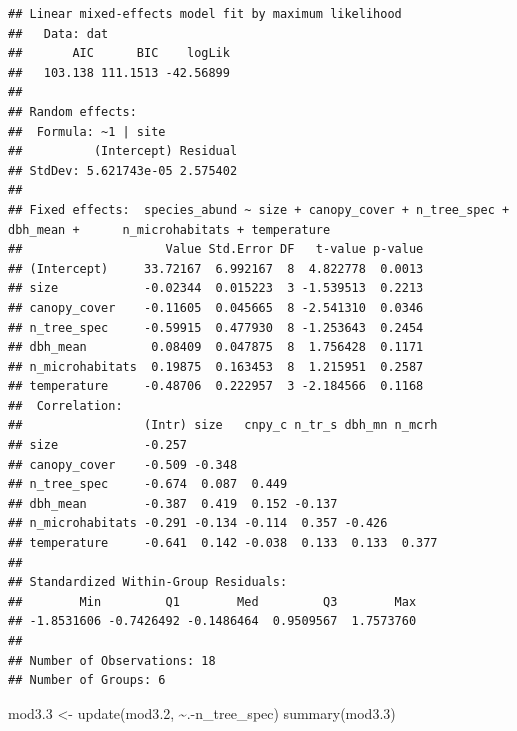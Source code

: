 \documentclass[
]{article}
\newenvironment{Shaded}{\begin{snugshade}}{\end{snugshade}}
\newcommand{\FloatTok}[1]{\textcolor[rgb]{0.00,0.00,0.81}{#1}}
\newcommand{\FunctionTok}[1]{\textcolor[rgb]{0.00,0.00,0.00}{#1}}
\newcommand{\NormalTok}[1]{#1}
\newcommand{\OtherTok}[1]{\textcolor[rgb]{0.56,0.35,0.01}{#1}}
\newcommand{\SpecialCharTok}[1]{\textcolor[rgb]{0.00,0.00,0.00}{#1}}
\begin{document}
\begin{verbatim}
## Linear mixed-effects model fit by maximum likelihood
##   Data: dat 
##       AIC      BIC    logLik
##   103.138 111.1513 -42.56899
## 
## Random effects:
##  Formula: ~1 | site
##          (Intercept) Residual
## StdDev: 5.621743e-05 2.575402
## 
## Fixed effects:  species_abund ~ size + canopy_cover + n_tree_spec + dbh_mean +      n_microhabitats + temperature 
##                    Value Std.Error DF   t-value p-value
## (Intercept)     33.72167  6.992167  8  4.822778  0.0013
## size            -0.02344  0.015223  3 -1.539513  0.2213
## canopy_cover    -0.11605  0.045665  8 -2.541310  0.0346
## n_tree_spec     -0.59915  0.477930  8 -1.253643  0.2454
## dbh_mean         0.08409  0.047875  8  1.756428  0.1171
## n_microhabitats  0.19875  0.163453  8  1.215951  0.2587
## temperature     -0.48706  0.222957  3 -2.184566  0.1168
##  Correlation: 
##                 (Intr) size   cnpy_c n_tr_s dbh_mn n_mcrh
## size            -0.257                                   
## canopy_cover    -0.509 -0.348                            
## n_tree_spec     -0.674  0.087  0.449                     
## dbh_mean        -0.387  0.419  0.152 -0.137              
## n_microhabitats -0.291 -0.134 -0.114  0.357 -0.426       
## temperature     -0.641  0.142 -0.038  0.133  0.133  0.377
## 
## Standardized Within-Group Residuals:
##        Min         Q1        Med         Q3        Max 
## -1.8531606 -0.7426492 -0.1486464  0.9509567  1.7573760 
## 
## Number of Observations: 18
## Number of Groups: 6
\end{verbatim}

\begin{Shaded}
\begin{Highlighting}[]
\NormalTok{mod3}\FloatTok{.3} \OtherTok{\textless{}{-}} \FunctionTok{update}\NormalTok{(mod3}\FloatTok{.2}\NormalTok{, }\SpecialCharTok{\textasciitilde{}}\NormalTok{.}\SpecialCharTok{{-}}\NormalTok{n\_tree\_spec)}
\FunctionTok{summary}\NormalTok{(mod3}\FloatTok{.3}\NormalTok{)}
\end{Highlighting}
\end{Shaded}
\end{document}
